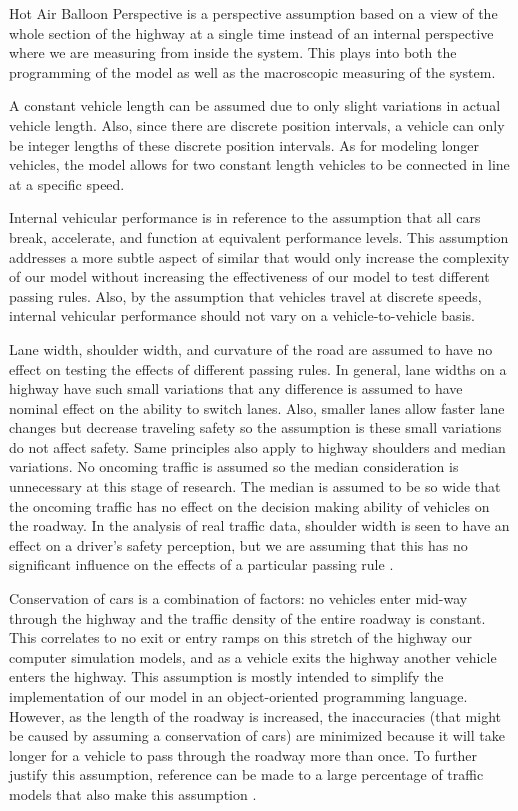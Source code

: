 \documentclass{amsart}
\begin{document}
		Hot Air Balloon Perspective is a perspective assumption based on a view of the whole section of the highway at a single time instead of an internal perspective where we are measuring from inside the system. This plays into both the programming of the model as well as the macroscopic measuring of the system. 
		
		A constant vehicle length can be assumed due to only slight variations in actual vehicle length. Also, since there are discrete position intervals, a vehicle can only be integer lengths of these discrete position intervals. As for modeling longer vehicles, the model allows for two constant length vehicles to be connected in line at a specific speed.

		Internal vehicular performance is in reference to the assumption that all cars break, accelerate, and function at equivalent performance levels. This assumption addresses a more subtle aspect of similar that would only increase the complexity of our model without increasing the effectiveness of our model to test different passing rules. Also, by the assumption that vehicles travel at discrete speeds, internal vehicular performance should not vary on a vehicle-to-vehicle basis. 

		Lane width, shoulder width, and curvature of the road are assumed to have no effect on testing the effects of different passing rules. In general, lane widths on a highway have such small variations that any difference is assumed to have nominal effect on the ability to switch lanes. Also, smaller lanes allow faster lane changes but decrease traveling safety so the assumption is these small variations do not affect safety. Same principles also apply to highway shoulders and median variations. No oncoming traffic is assumed so the median consideration is unnecessary at this stage of research. The median is assumed to be so wide that the oncoming traffic has no effect on the decision making ability of vehicles on the roadway. In the analysis of real traffic data, shoulder width is seen to have an effect on a driver's safety perception, but we are assuming that this has no significant influence on the effects of a particular passing rule \cite{elvik2009handbook}.
		 
		 Conservation of cars is a combination of factors: no vehicles enter mid-way through the highway and the traffic density of the entire roadway is constant. This correlates to no exit or entry ramps on this stretch of the highway our computer simulation models, and as a vehicle exits the highway another vehicle enters the highway. This assumption is mostly intended to simplify the implementation of our model in an object-oriented programming language. However, as the length of the roadway is increased, the inaccuracies (that might be caused by assuming a conservation of cars) are minimized because it will take longer for a vehicle to pass through the roadway more than once. To further justify this assumption, reference can be made to a large percentage of traffic models that also make this assumption \cite{seiboldconstructing}. 
		 
\end{document}
